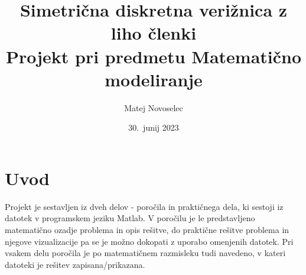 \documentclass{article}
\begin{document}
\title{Simetrična diskretna verižnica z liho členki\\
    \large Projekt pri predmetu Matematično modeliranje
}
\author{
    Matej Novoselec\\
}
\date{30.\ junij 2023}

\maketitle

\section{Uvod}
Projekt je sestavljen iz dveh delov - poročila in praktičnega dela, ki sestoji iz datotek v programskem jeziku Matlab.
V poročilu je le predstavljeno matematično ozadje problema in opis rešitve, do praktične rešitve problema in njegove vizualizacije pa se je možno dokopati z uporabo omenjenih datotek.
Pri vsakem delu poročila je po matematičnem razmisleku tudi navedeno, v kateri datoteki je rešitev zapisana/prikazana. 
\end{document}
